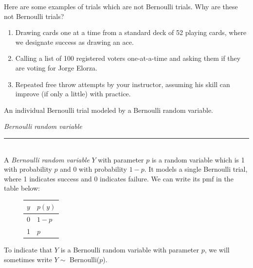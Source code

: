 \documentclass[12pt]{article}
\theoremstyle{definition}
\theoremstyle{remark}
\begin{document}
Here are some examples of trials which are not Bernoulli trials. Why are these not Bernoulli trials?
\begin{enumerate}
\item Drawing cards one at a time from a standard deck of 52 playing cards, where we designate success as drawing an ace.
\item Calling a list of 100 registered voters one-at-a-time and asking them if they are voting for Jorge Elorza.
\item Repeated free throw attempts by your instructor, assuming his skill can improve (if only a little) with practice.
\end{enumerate}

An individual Bernoulli trial modeled by a Bernoulli random variable.

\begin{framed}
  \emph{Bernoulli random variable}\\
  \rule{\dimexpr{}\fboxrule}{.1pt} \\
A \emph{Bernoulli random variable} $Y$ with parameter $p$ is a random variable which is 1 with probability $p$ and 0 with probability $1 - p$. It models a single Bernoulli trial, where 1 indicates success and 0 indicates failure. We can write its pmf in the table below:
\begin{figure}[H]
\centering
\begin{tabular}{l@{\hskip 2cm}l}
\toprule
$y$ & $p(y)$\\
\midrule
0 & $1 - p$\\
1 & $p$ \\
\bottomrule
\end{tabular}
\end{figure}
To indicate that $Y$ is a Bernoulli random variable with parameter $p$, we will sometimes write $Y \sim$ Bernoulli($p$).
\end{framed}
\end{document}

